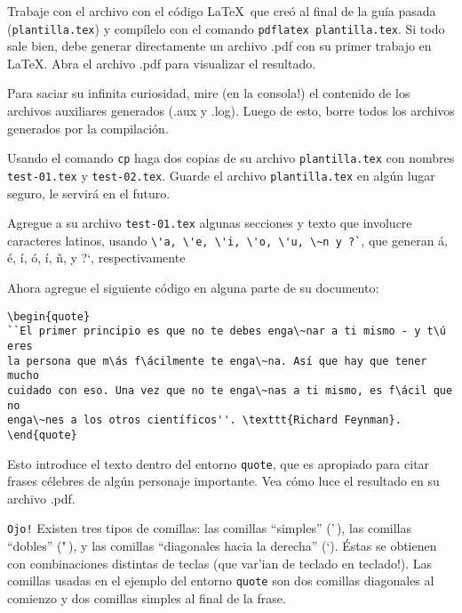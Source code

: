 \documentclass[11pt]{exam}
\begin{document}
\begin{questions}
\item Trabaje con el archivo con el código \LaTeX\ que creó al final de la guía pasada (\texttt{plantilla.tex}) y compílelo con el comando \texttt{pdflatex plantilla.tex}. Si todo sale bien, debe generar directamente un archivo .pdf con su primer trabajo en \LaTeX.
Abra el archivo .pdf para visualizar el resultado.

\item Para saciar su infinita curiosidad, mire (en la consola!) el contenido de los archivos auxiliares generados (.aux y .log). Luego de esto, borre todos los archivos generados por la compilación.

\item Usando el comando \texttt{cp} haga dos copias de su archivo \texttt{plantilla.tex} con nombres \texttt{test-01.tex} y \texttt{test-02.tex}. Guarde el archivo \texttt{plantilla.tex} en algún lugar seguro, le servirá en el futuro.

\item Agregue a su archivo \texttt{test-01.tex} algunas secciones y texto que involucre caracteres latinos, usando \verb|\'a, \'e, \'i, \'o, \'u, \~n y ?`|, que generan á, é, í, ó, í, \~n, y ?`, respectivamente

\item Ahora agregue el siguiente código en alguna parte de su documento:

\begin{verbatim}
\begin{quote}
``El primer principio es que no te debes enga\~nar a ti mismo - y t\ú eres 
la persona que m\ás f\ácilmente te enga\~na. Así que hay que tener mucho 
cuidado con eso. Una vez que no te enga\~nas a ti mismo, es f\ácil que no 
enga\~nes a los otros científicos''. \texttt{Richard Feynman}.
\end{quote}
\end{verbatim}

Esto introduce el texto dentro del entorno \texttt{quote}, que es apropiado para citar frases célebres de algún personaje importante. Vea cómo luce el resultado en su archivo .pdf.

\texttt{Ojo!} Existen tres tipos de comillas: 	las comillas ``simples'' ('\,), las comillas ``dobles'' ("\,), y las comillas ``diagonales hacia la derecha'' (`). Éstas se obtienen con combinaciones distintas de teclas (que var'ian de teclado en teclado!). Las comillas usadas en el ejemplo del entorno \texttt{quote} son dos comillas diagonales al comienzo y dos comillas simples al final de la frase.



\end{questions}
\end{document}
